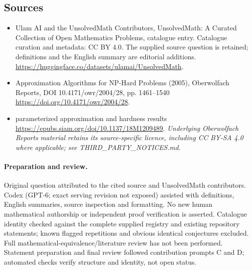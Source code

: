 \documentclass[11pt]{article}
\begin{document}
\subsection{Sources}
\begin{itemize}
\item[\hypertarget{source:statement:1}{S1}] Ulam AI and the UnsolvedMath Contributors, UnsolvedMath: A Curated Collection of Open Mathematics Problems, catalogue entry. Catalogue curation and metadata: CC BY 4.0. The supplied source question is retained; definitions and the English summary are editorial additions.
\url{https://huggingface.co/datasets/ulamai/UnsolvedMath}.
\item[\hypertarget{source:statement:2}{S2}] Approximation Algorithms for NP-Hard Problems (2005), Oberwolfach Reports, DOI 10.4171/owr/2004/28, pp. 1461--1540
\url{https://doi.org/10.4171/owr/2004/28}.
\item[\hypertarget{source:statement:3}{S3}] parameterized approximation and hardness results
\url{https://epubs.siam.org/doi/10.1137/18M1209489}.
\textit{Underlying Oberwolfach Reports material retains its source-specific licence, including CC BY-SA 4.0 where applicable; see THIRD\_PARTY\_NOTICES.md.}
\end{itemize}
\paragraph{Preparation and review.}
Original question attributed to the cited source and UnsolvedMath contributors. Codex (GPT-6; exact serving revision not exposed) assisted with definitions, English summaries, source inspection and formatting. No new human mathematical authorship or independent proof verification is asserted. Catalogue identity checked against the complete supplied registry and existing repository statements; known flagged repetitions and obvious identical conjectures excluded. Full mathematical-equivalence/literature review has not been performed. Statement preparation and final review followed contribution prompts C and D; automated checks verify structure and identity, not open status.
\label{end:statement}
\end{document}
